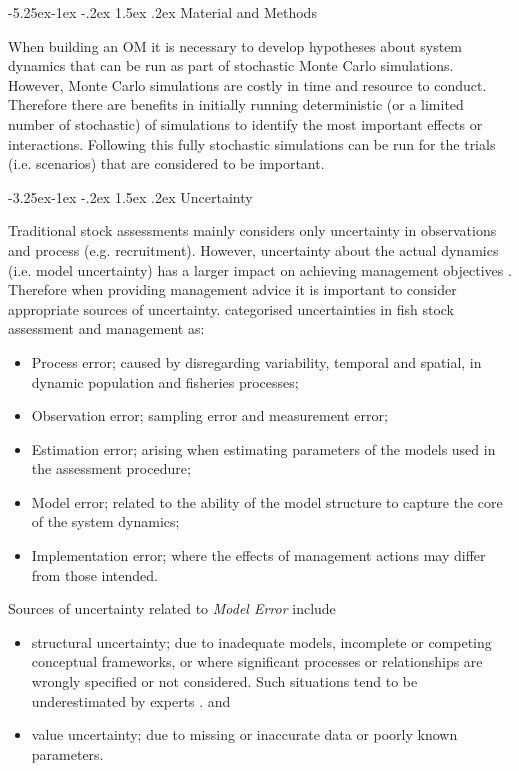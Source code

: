 \documentclass[a4paper, 10pt]{article}
\makeatletter
\renewcommand{\subsection}{\@startsection{subsection}{2}{\z@}%
  {-3.25ex\@plus -1ex \@minus -.2ex}%
  {1.5ex \@plus .2ex}%
  {\normalfont\bfseries\slshape}}
\renewcommand{\section}{\@startsection{section}{1}{\z@}%
  {-5.25ex\@plus -1ex \@minus -.2ex}%
  {1.5ex \@plus .2ex}%
  {\normalfont\bfseries}}
\makeatother
\begin{document}
\section{Material and Methods}

When building an OM it is necessary to develop hypotheses about system dynamics that can be
run as part of stochastic Monte Carlo simulations. However, Monte Carlo simulations are costly 
in time and resource to conduct. Therefore there are benefits in initially running deterministic 
(or a limited number of stochastic) of simulations to identify the most important effects or interactions. 
Following this fully stochastic simulations can be run for the trials (i.e. scenarios) that
are considered to be important. 

\subsection{Uncertainty}

Traditional stock assessments mainly considers only uncertainty in observations and process (e.g. recruitment). 
However, uncertainty about the actual dynamics (i.e. model uncertainty) has a larger impact on achieving management objectives \cite{punt_refocusing_2008}. 
Therefore when providing management advice it is important to consider appropriate sources of uncertainty.  \cite{rosenberg1994uncertainty} 
categorised uncertainties in fish stock 
assessment and management as:

\begin{itemize}
 \item Process error; caused by disregarding variability, temporal and spatial, in dynamic population and fisheries processes;
 \item Observation error;  sampling error and measurement error;
 \item Estimation error; arising when estimating parameters of the models used in the assessment procedure;
 \item Model error; related to the ability of the model structure to capture the core of the system dynamics;
 \item Implementation error;  where the effects of management actions may differ from those intended.
\end{itemize}

Sources of uncertainty related to \emph{Model Error} include
    
\begin{itemize}
 \item structural uncertainty; due to inadequate models, incomplete or competing conceptual frameworks, or where significant processes or 
relationships are wrongly specified or not considered. Such situations tend to be underestimated by experts \cite{morgan1990uncertainty}. and
 \item value uncertainty; due to missing or inaccurate data or poorly known parameters.
\end{itemize}
\end{document}
